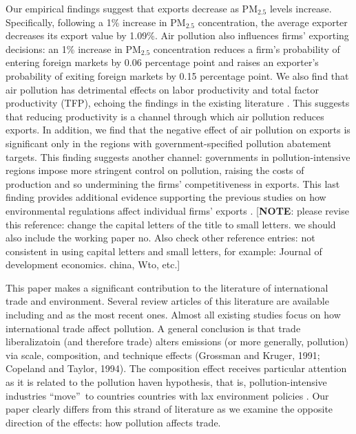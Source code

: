 \documentclass[12pt]{article}
\begin{document}
Our empirical findings suggest that exports decrease as $\mathrm{PM_{2.5}}$
levels increase. Specifically, following a 1\% increase in $\mathrm{PM_{2.5}}
$ concentration, the average exporter decreases its export value by 1.09\%.
Air pollution also influences firms' exporting decisions: an 1\% increase in 
$\mathrm{PM_{2.5}}$ concentration reduces a firm's probability of entering
foreign markets by 0.06 percentage point and raises an exporter's
probability of exiting foreign markets by 0.15 percentage point. We also
find that air pollution has detrimental effects on labor productivity and
total factor productivity (TFP), echoing the findings in the existing
literature \citep{greenstone2012effects,fu2021air,khanna2021productivity}.
This suggests that reducing productivity is a channel through which air
pollution reduces exports. In addition, we find that the negative effect of
air pollution on exports is significant only in the regions with
government-specified pollution abatement targets. This finding suggests
another channel: governments in pollution-intensive regions impose more
stringent control on pollution, raising the costs of production and so
undermining the firms' competitiveness in exports. This last finding
provides additional evidence supporting the previous studies on how
environmental regulations affect individual firms' exports %
\citep{cherniwchan2022international}. [\textbf{NOTE}: please revise this
reference: change the capital letters of the title to small letters. we
should also include the working paper no. Also check other reference
entries: not consistent in using capital letters and small letters, for
example: Journal of development economics. china, Wto, etc.]

This paper makes a significant contribution to the literature of
international trade and environment. Several review articles of this
literature are available including \cite{cherniwchan2017trade} and \cite%
{cherniwchan2022international} as the most recent ones. Almost all existing
studies focus on how international trade affect pollution. A general
conclusion is that trade liberalizatoin (and therefore trade) alters
emissions (or more generally, pollution) via scale, composition, and
technique effects (Grossman and Kruger, 1991; Copeland and Taylor, 1994).
The composition effect receives particular attention as it is related to the
pollution haven hypothesis, that is, pollution-intensive industries
\textquotedblleft move\textquotedblright\ to countries countries with lax
environment policies \citep{copeland1994north,taylor2005unbundling}. Our
paper clearly differs from this strand of literature as we examine the
opposite direction of the effects: how pollution affects trade.
\end{document}
